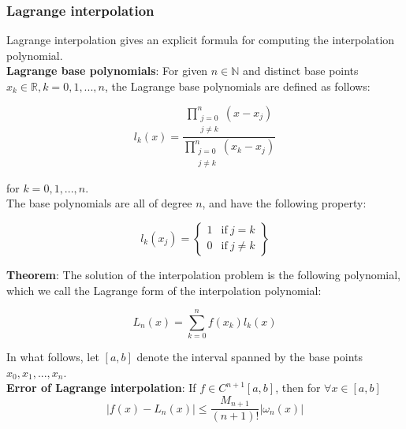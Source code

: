 \documentclass[margin=0px]{article}
\begin{document}
\subsubsection{Lagrange interpolation}
Lagrange interpolation gives an explicit formula for computing the interpolation polynomial.\\

\noindent \textbf{Lagrange base polynomials}: For given $n \in \mathbb{N}$ and distinct base points $x_{k} \in \mathbb{R}, k=0,1,...,n$,
the Lagrange base polynomials are defined as follows:

\begin{displaymath}
    l_{k}(x) =
    \frac
    {\displaystyle\prod_{\substack{j=0\\j \not = k}}^{n}(x-x_{j})}
    {\displaystyle\prod_{\substack{j=0\\j \not = k}}^{n}(x_{k}-x_{j})}
\end{displaymath}

\noindent for $k=0,1, ..., n$.\\

\noindent The base polynomials are all of degree $n$, and have the following property:

\begin{displaymath}
    l_{k}(x_{j})=\left\{\begin{array}{lr}
        1 & \text{if} \ j=k        \\
        0 & \text{if} \ j \not = k
    \end{array}
    \right\}
\end{displaymath}

\noindent \textbf{Theorem}: The solution of the interpolation problem is the following polynomial, which we call
the Lagrange form of the interpolation polynomial:

\begin{displaymath}
    L_{n}(x) = \sum_{k=0}^{n}f(x_{k})l_{k}(x)
\end{displaymath}

\noindent In what follows, let $[a,b]$ denote the interval spanned by the base points $x_{0}, x_{1}, ..., x_{n}$.\\

\noindent \textbf{Error of Lagrange interpolation}: If $f \in C^{n+1}[a,b]$, then for $\forall x \in [a,b]$
\begin{displaymath}
    |f(x) - L_{n}(x)| \leq \frac{M_{n+1}}{(n+1)!}|\omega_{n}(x)|
\end{displaymath}
\end{document}
